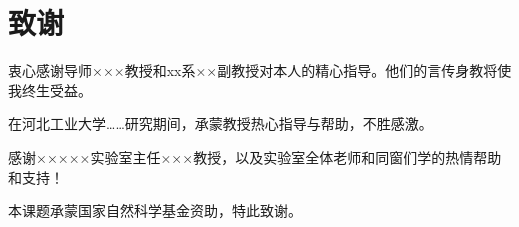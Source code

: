 \chapter*{致谢}

衷心感谢导师×××教授和xx系××副教授对本人的精心指导。他们的言传身教将使我终生受益。

在河北工业大学……研究期间，承蒙教授热心指导与帮助，不胜感激。

感谢×××××实验室主任×××教授，以及实验室全体老师和同窗们学的热情帮助和支持！

本课题承蒙国家自然科学基金资助，特此致谢。